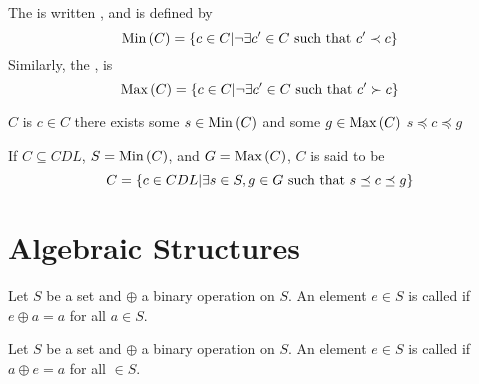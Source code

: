 \begin{defi}
The  is written , and is defined by
\begin{equation}
\mbox{Min}\left(C\right)=\left\{ c\in C|\neg\exists c'\in C\mbox{ such that{} }c'\prec c\right\}
\end{equation}
Similarly, the ,  is
\begin{equation}
\mbox{Max}\left(C\right)=\left\{ c\in C|\neg\exists c'\in C\mbox{ such that{} }c'\succ c\right\}
\end{equation}
\cite{conf/ijcai/Hirsh91}
\end{defi}

\begin{defi}
$C$ is  \iffTx{} \faTx{} $c\in C$ there exists some $s\in\mbox{Min}\left(C\right)$ and some $g\in\mbox{Max}\left(C\right)$ \stTx{} $s\preceq c\preceq g$
\cite{conf/ijcai/Hirsh91}
\end{defi}

\begin{defi}
If $C\subseteq CDL$, $S=\mbox{Min}\left(C\right)$, and $G=\mbox{Max}\left(C\right)$, $C$ is said to be  \iffTx{}
\begin{equation}
C=\left\{ c\in CDL|\exists s\in S, g\in G\mbox{ such that{} }s\preceq c\preceq g\right\}
\end{equation}
\cite{conf/ijcai/Hirsh91}
\end{defi}

\section{Algebraic Structures}

\begin{defi} Let $S$ be a set and $\oplus$ a binary operation on $S$. An element $e\in S$ is called  if $e\oplus a = a$ for all $a\in S$.\cite{Oppliger:2011:CC:2049860}
\end{defi}

\begin{defi} Let $S$ be a set and $\oplus$ a binary operation on $S$. An element $e\in S$ is called  if $a\oplus e = a$ for all $\in S$.\cite{Oppliger:2011:CC:2049860}
\end{defi}

